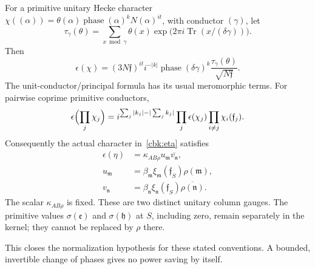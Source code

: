 \begin{proposition}
\label{cbk:root}
For a primitive unitary Hecke character
$\chi((\alpha))=\theta(\alpha)\operatorname{phase}(\alpha)^k
N(\alpha)^{it}$, with conductor $(\gamma)$, let
\[
 \tau_\gamma(\theta)=\sum_{x\bmod\gamma}
       \theta(x)\exp\bigl(2\pi i\operatorname{Tr}(x/(\delta\gamma))\bigr).
\]
Then
\begin{equation}\label{cbk:root-formula}
 \epsilon(\chi)=(3N\mathfrak f)^{it}i^{-|k|}
       \operatorname{phase}(\delta\gamma)^k
                       \frac{\tau_\gamma(\theta)}{\sqrt{N\mathfrak f}}.
\end{equation}
The unit-conductor/principal formula has its usual meromorphic terms.
For pairwise coprime primitive conductors,
\begin{equation}\label{cbk:root-product}
 \epsilon\Bigl(\prod_j\chi_j\Bigr)
  =i^{\sum_j|k_j|-|\sum_jk_j|}
       \prod_j\epsilon(\chi_j)\prod_{i\ne j}\chi_i(\mathfrak f_j).
\end{equation}
Consequently the actual character in~\eqref{cbk:eta} satisfies
\begin{equation}\label{cbk:two-gauges}
 \begin{aligned}
 \epsilon(\eta)&=\kappa_{AB\rho}u_{\mathfrak m}
                                      \overline{v_{\mathfrak n}},\\
 u_{\mathfrak m}&=\beta_{\mathfrak m}\xi_{\mathfrak m}(\mathfrak f_S)
                                                     \rho(\mathfrak m),\\
 v_{\mathfrak n}&=\beta_{\mathfrak n}\xi_{\mathfrak n}(\mathfrak f_S)
                                           \overline{\rho(\mathfrak n)}.
 \end{aligned}
\end{equation}
The scalar $\kappa_{AB\rho}$ is fixed. These are two distinct unitary
column gauges. The primitive values $\sigma(\mathfrak e)$ and
$\sigma(\mathfrak h)$ at $S$, including zero, remain separately in
the kernel; they cannot be replaced by $\rho$ there.
\end{proposition}
This closes the normalization hypothesis for these stated conventions.
A bounded, invertible change of phases gives no power saving by itself.

